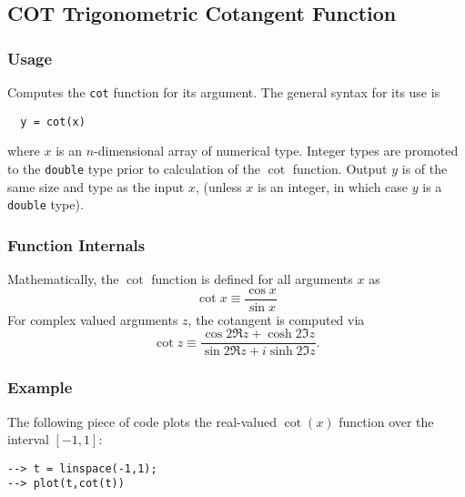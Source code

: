 %
%
%
\subsection{COT Trigonometric Cotangent Function}
\subsubsection{Usage}
Computes the \verb|cot| function for its argument.  The general
syntax for its use is
\begin{verbatim}
  y = cot(x)
\end{verbatim}
where $x$ is an $n$-dimensional array of numerical type.
Integer types are promoted to the \verb|double| type prior to
calculation of the $\cot$ function.  Output $y$ is of the
same size and type as the input $x$, (unless $x$ is an
integer, in which case $y$ is a \verb|double| type).  
\subsubsection{Function Internals}
Mathematically, the $\cot$ function is defined for all 
arguments $x$ as
\[
  \cot x \equiv \frac{\cos x}{\sin x}
\]
For complex valued arguments $z$, the cotangent is computed via
\[
  \cot z \equiv \frac{\cos 2 \Re z + \cosh 2 \Im z}{\sin 2 \Re z + 
  i \sinh 2 \Im z}.
\]
\subsubsection{Example}
The following piece of code plots the real-valued $\cot(x)$
function over the interval $[-1,1]$:
\begin{verbatim}
--> t = linspace(-1,1);
--> plot(t,cot(t))
\end{verbatim}
